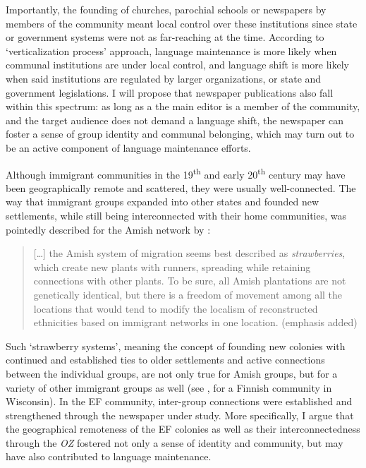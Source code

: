 \documentclass[output=paper]{langsci/langscibook}
\begin{document}
Importantly, the founding of churches, parochial schools or newspapers by members of the community meant local control over these institutions since state or government systems were not as far-reaching at the time. According to \citet{Salmons1983} ‘verticalization process’ approach, language maintenance is more likely when communal institutions are under local control, and language shift is more likely when said institutions are regulated by larger organizations, or state and government legislations. I will propose that newspaper publications also fall within this spectrum: as long as a the main editor is a member of the community, and the target audience does not demand a language shift, the newspaper can foster a sense of group identity and communal belonging, which may turn out to be an active component of language maintenance efforts. 


Although immigrant communities in the 19\textsuperscript{th} and early 20\textsuperscript{th} century may have been geographically remote and scattered, they were usually well-connected. The way that immigrant groups expanded into other states and founded new settlements, while still being interconnected with their home communities, was pointedly described for the Amish network by \citet[183]{Reschly2000}:
 
\begin{quote}
 […] the Amish system of migration seems best described as \textit{strawberries}, which create  new plants with runners, spreading while retaining connections with other plants. To be  sure, all Amish plantations are not genetically identical, but there is a freedom of  movement among all the locations that would tend to modify the localism of  reconstructed ethnicities based on immigrant networks in one location. (emphasis added)
\end{quote}

Such ‘strawberry systems’, meaning the concept of founding new colonies with continued and established ties to older settlements and active connections between the individual groups, are not only true for Amish groups, but for a variety of other immigrant groups as well (see \citealt{Johnson2018}, for a Finnish community in Wisconsin). In the EF community, inter-group connections were established and strengthened through the newspaper under study. More specifically, I argue that the geographical remoteness of the EF colonies as well as their interconnectedness through the \textit{OZ} fostered not only a sense of identity and community, but may have also contributed to language maintenance.
\end{document}
